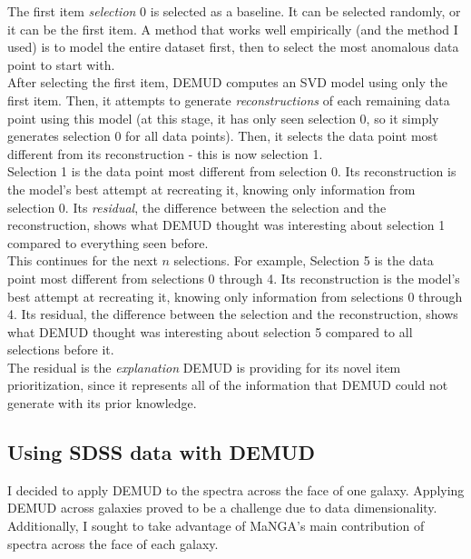 \documentclass[10pt, letterpaper, notitlepage]{article}
\begin{document}
The first item \textit{selection} 0 is selected as a baseline. It can be selected randomly, or it can be the
first item. A method that works well empirically (and the method I used) is to model the entire
dataset first, then to select the most anomalous data point to start with.\\

After selecting the first item, DEMUD computes an SVD model using only the first item. Then, it attempts
to generate \textit{reconstructions} of each remaining data point using this model (at this stage, it has only
seen selection 0, so it simply generates selection 0 for all data points). Then, it selects the data point
most different from its reconstruction - this is now selection 1.\\

Selection 1 is the data point most different from selection 0. Its reconstruction is the model's best
attempt at recreating it, knowing only information from selection 0. Its \textit{residual}, the difference
between the selection and the reconstruction, shows what DEMUD thought was interesting about selection 1 compared
to everything seen before.\\

This continues for the next $n$ selections. For example, Selection 5 is the data point most different from
selections 0 through 4. Its reconstruction is the model's best attempt at recreating it, knowing only
information from selections 0 through 4. Its residual, the difference between the selection and the reconstruction,
shows what DEMUD thought was interesting about selection 5 compared to all selections before it.\\

The residual is the \textit{explanation} DEMUD is providing for its novel item prioritization, since it
represents all of the information that DEMUD could not generate with its prior knowledge.

\subsection{Using SDSS data with DEMUD}

I decided to apply DEMUD to the spectra across the face of one galaxy. Applying DEMUD across galaxies proved
to be a challenge due to data dimensionality. Additionally, I sought to take advantage of MaNGA's main
contribution of spectra across the face of each galaxy.\\
\end{document}
